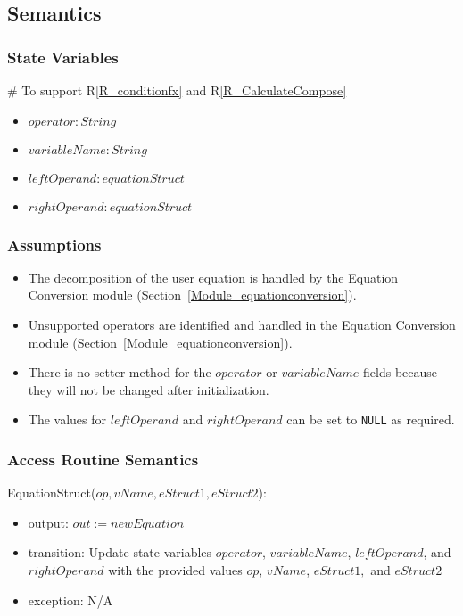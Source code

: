 \documentclass[12pt, titlepage]{article}
\newcommand{\rref}[1]{R\ref{#1}}
\begin{document}
\subsection{Semantics}

\subsubsection{State Variables}

\# To support \rref{R_conditionfx} and \rref{R_CalculateCompose}
\begin{itemize}
	\item $operator : String$
	\item $variableName : String$
	\item $leftOperand : equationStruct$
	\item $rightOperand : equationStruct$
\end{itemize}

\subsubsection{Assumptions}

\begin{itemize}
	\item The decomposition of the user equation is handled by the Equation 
	Conversion module (Section~\ref{Module_equationconversion}).
	\item Unsupported operators are identified and handled in the Equation 
	Conversion module (Section~\ref{Module_equationconversion}).
	\item There is no setter method for the $operator$ or $variableName$ fields 
	because they will not be changed after initialization.
	\item The values for $leftOperand$ and $rightOperand$ can be set to 
	\texttt{NULL} as required.
\end{itemize}

\subsubsection{Access Routine Semantics}

\noindent EquationStruct($op, vName, eStruct1, eStruct2$):
\begin{itemize}
	\item output: $out := newEquation$
	\item transition: Update state variables $operator$, $variableName$, 
	$leftOperand$, and $rightOperand$ with the provided values $op$, $vName$, 
	$eStruct1,$ and $eStruct2$
	\item exception: N/A
\end{itemize}
\end{document}
